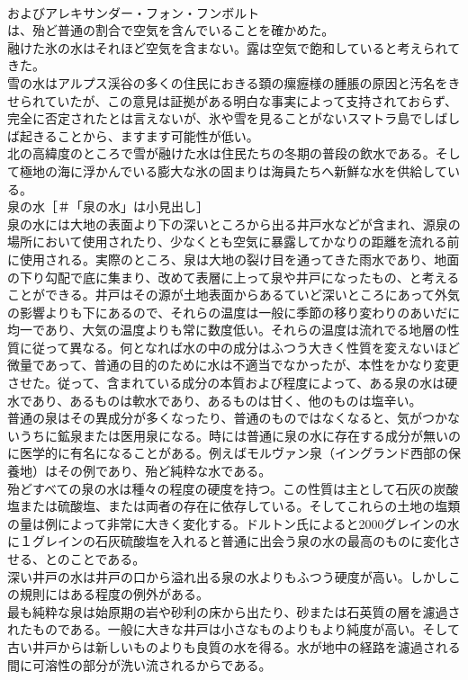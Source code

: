 \documentclass[8pt]{extreport}
\begin{document}
\begin{CJK}{UTF8}{min}
\\	およびアレキサンダー・フォン・フンボルト
\\	は、殆ど普通の割合で空気を含んでいることを確かめた。
\\	融けた氷の水はそれほど空気を含まない。露は空気で飽和していると考えられてきた。
\\	雪の水はアルプス渓谷の多くの住民におきる頚の瘰癧様の腫脹の原因と汚名をきせられていたが、この意見は証拠がある明白な事実によって支持されておらず、完全に否定されたとは言えないが、氷や雪を見ることがないスマトラ島でしばしば起きることから、ますます可能性が低い。
\\	北の高緯度のところで雪が融けた水は住民たちの冬期の普段の飲水である。そして極地の海に浮かんでいる膨大な氷の固まりは海員たちへ新鮮な水を供給している。
\\	泉の水［＃「泉の水」は小見出し］
\\	泉の水には大地の表面より下の深いところから出る井戸水などが含まれ、源泉の場所において使用されたり、少なくとも空気に暴露してかなりの距離を流れる前に使用される。実際のところ、泉は大地の裂け目を通ってきた雨水であり、地面の下り勾配で底に集まり、改めて表層に上って泉や井戸になったもの、と考えることができる。井戸はその源が土地表面からあるていど深いところにあって外気の影響よりも下にあるので、それらの温度は一般に季節の移り変わりのあいだに均一であり、大気の温度よりも常に数度低い。それらの温度は流れでる地層の性質に従って異なる。何となれば水の中の成分はふつう大きく性質を変えないほど微量であって、普通の目的のために水は不適当でなかったが、本性をかなり変更させた。従って、含まれている成分の本質および程度によって、ある泉の水は硬水であり、あるものは軟水であり、あるものは甘く、他のものは塩辛い。
\\	普通の泉はその異成分が多くなったり、普通のものではなくなると、気がつかないうちに鉱泉または医用泉になる。時には普通に泉の水に存在する成分が無いのに医学的に有名になることがある。例えばモルヴァン泉（イングランド西部の保養地）はその例であり、殆ど純粋な水である。
\\	殆どすべての泉の水は種々の程度の硬度を持つ。この性質は主として石灰の炭酸塩または硫酸塩、または両者の存在に依存している。そしてこれらの土地の塩類の量は例によって非常に大きく変化する。ドルトン氏によると2000グレインの水に１グレインの石灰硫酸塩を入れると普通に出会う泉の水の最高のものに変化させる、とのことである。
\\	深い井戸の水は井戸の口から溢れ出る泉の水よりもふつう硬度が高い。しかしこの規則にはある程度の例外がある。
\\	最も純粋な泉は始原期の岩や砂利の床から出たり、砂または石英質の層を濾過されたものである。一般に大きな井戸は小さなものよりもより純度が高い。そして古い井戸からは新しいものよりも良質の水を得る。水が地中の経路を濾過される間に可溶性の部分が洗い流されるからである。

\end{CJK}
\end{document}
